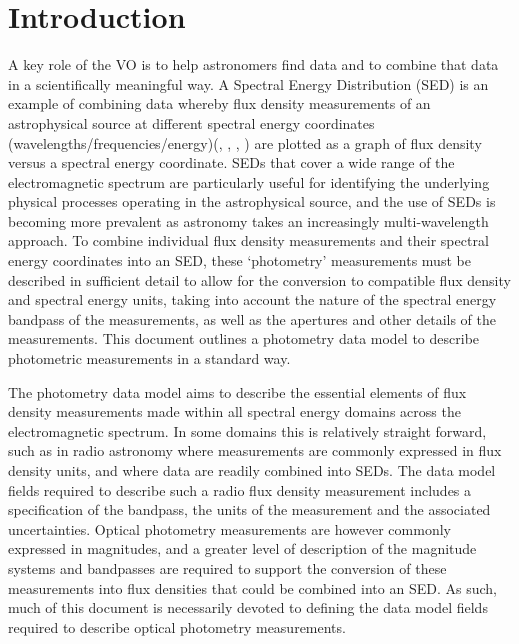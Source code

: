 \documentclass[11pt,a4paper]{ivoa}
\begin{document}
\section{Introduction}
A key role of the VO is to help astronomers find data and to combine that data in a scientifically meaningful way. A Spectral Energy Distribution (SED) is an example of combining data whereby flux density measurements of an astrophysical source at different spectral energy coordinates (wavelengths/frequencies/energy)(\cite{doi:10.1146/annurev.astro.41.082801.100251}, \cite{longo}, \cite{connell}, \cite{brujine}) are plotted as a graph of flux density versus a spectral energy coordinate. SEDs that cover a wide range of the electromagnetic spectrum are particularly useful for identifying the underlying physical processes operating in the astrophysical source, and the use of SEDs is becoming more prevalent as astronomy takes an increasingly multi-wavelength approach. To combine individual flux density measurements and their spectral energy coordinates into an SED, these ‘photometry’ measurements must be described in sufficient detail to allow for the conversion to compatible flux density and spectral energy units,  taking into account the nature of the spectral energy bandpass of the measurements, as well as the apertures and other details of  the measurements. This document outlines a photometry data model to describe photometric measurements in a standard way.
\par

The photometry data model aims to describe the essential elements of flux density measurements made within all spectral energy domains across the electromagnetic spectrum. In some domains this is relatively straight forward, such as in radio astronomy where measurements are commonly expressed in flux density units, and where data are readily combined into SEDs. The data model fields required to describe such a radio flux density measurement includes a specification of the bandpass, the units of the measurement and the associated uncertainties. Optical photometry measurements are however commonly expressed in magnitudes, and a greater level of description of the magnitude systems and bandpasses are required to support the conversion of these measurements into flux densities that could be combined into an SED. As such, much of this document is necessarily devoted to defining the data model fields required to describe optical photometry measurements.
\par
\end{document}
